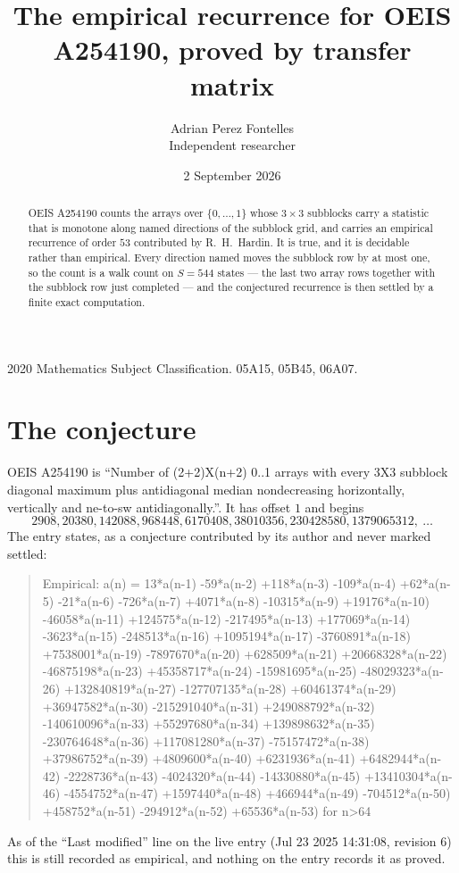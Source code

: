 \documentclass[11pt,a4paper]{article}
\title{The empirical recurrence for OEIS A254190, proved by transfer matrix}
\author{Adrian Perez Fontelles\\ \small Independent researcher}
\date{2 September 2026}
\theoremstyle{plain}
\theoremstyle{definition}
\begin{document}
\maketitle

\begin{abstract}
OEIS A254190 counts the arrays over $\{0,\dots,1\}$ whose $3\times3$ subblocks carry a
statistic that is monotone along named directions of the subblock grid, and carries an
empirical recurrence of order $53$ contributed by R.~H.~Hardin. It is true, and it is
decidable rather than empirical. Every direction named moves the subblock row by at most one,
so the count is a walk count on $S=544$ states --- the last two array rows together with the
subblock row just completed --- and the conjectured recurrence is then settled by a finite
exact computation.
\end{abstract}

\noindent\small 2020 Mathematics Subject Classification. 05A15, 05B45, 06A07.\normalsize

\section{The conjecture}

OEIS A254190 is ``Number of (2+2)X(n+2) 0..1 arrays with every 3X3 subblock diagonal maximum plus antidiagonal median nondecreasing horizontally, vertically and ne-to-sw antidiagonally.''. It has offset $1$ and begins
\[
2908, 20380, 142088, 968448, 6170408, 38010356, 230428580, 1379065312,\ \dots
\]
The entry states, as a conjecture contributed by its author and never marked settled:
\begin{quote}
Empirical: a(n) = 13*a(n-1) -59*a(n-2) +118*a(n-3) -109*a(n-4) +62*a(n-5) -21*a(n-6) -726*a(n-7) +4071*a(n-8) -10315*a(n-9) +19176*a(n-10) -46058*a(n-11) +124575*a(n-12) -217495*a(n-13) +177069*a(n-14) -3623*a(n-15) -248513*a(n-16) +1095194*a(n-17) -3760891*a(n-18) +7538001*a(n-19) -7897670*a(n-20) +628509*a(n-21) +20668328*a(n-22) -46875198*a(n-23) +45358717*a(n-24) -15981695*a(n-25) -48029323*a(n-26) +132840819*a(n-27) -127707135*a(n-28) +60461374*a(n-29) +36947582*a(n-30) -215291040*a(n-31) +249088792*a(n-32) -140610096*a(n-33) +55297680*a(n-34) +139898632*a(n-35) -230764648*a(n-36) +117081280*a(n-37) -75157472*a(n-38) +37986752*a(n-39) +4809600*a(n-40) +6231936*a(n-41) +6482944*a(n-42) -2228736*a(n-43) -4024320*a(n-44) -14330880*a(n-45) +13410304*a(n-46) -4554752*a(n-47) +1597440*a(n-48) +466944*a(n-49) -704512*a(n-50) +458752*a(n-51) -294912*a(n-52) +65536*a(n-53) for n>64
\end{quote}
As of the ``Last modified'' line on the live entry (Jul 23 2025 14:31:08, revision 6) this is still
recorded as empirical, and nothing on the entry records it as proved.
\end{document}
